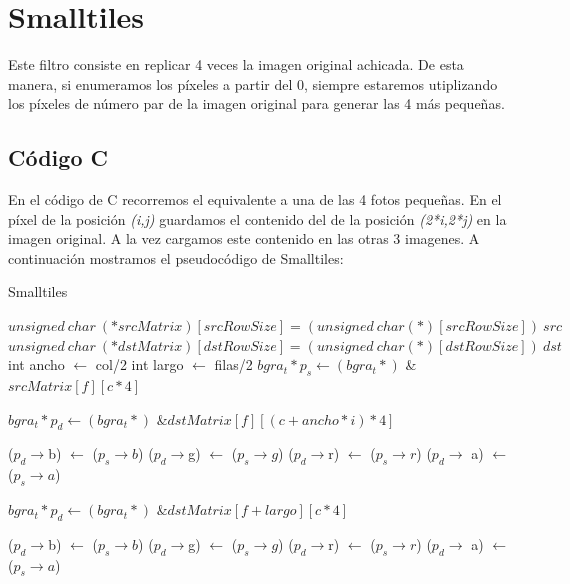 \section{Smalltiles}
Este filtro consiste en replicar 4 veces la imagen original achicada. De esta manera, si enumeramos los píxeles a partir del 0, siempre estaremos utiplizando los píxeles de número par de la imagen original para generar las 4 más pequeñas.
\subsection{Código C}
	En el código de C recorremos el equivalente a una de las 4 fotos pequeñas. En el píxel de la posición \emph{(i,j)} guardamos el contenido del de la posición \emph{(2*i,2*j)} en la imagen original. A la vez cargamos este contenido en las otras 3 imagenes.
	A continuación mostramos el pseudocódigo de Smalltiles:
\begin{algorithm}[h!]
\caption{Smalltiles}
\begin{algorithmic}
	\State $unsigned~ char~ (*srcMatrix)[srcRowSize] = (unsigned~ char (*)[srcRowSize])~ src$
	\State $unsigned~ char~ (*dstMatrix)[dstRowSize] = (unsigned~ char (*)[dstRowSize])~ dst$
	\State int ancho $\gets$ col/2
	\State int largo $\gets$ filas/2
			\State $bgra_t* p_s \gets (bgra_t*)$ \& $srcMatrix[f][c * 4]$
				
				\State $bgra_t *p_d \gets (bgra_t*)$ \&$dstMatrix[f][(c + ancho*i) * 4]$
				
				\State ($p_d \rightarrow$b) $\gets$ ($p_s \rightarrow b$)
				\State ($p_d \rightarrow$g) $\gets$ ($p_s \rightarrow g$)
				\State ($p_d \rightarrow$r) $\gets$ ($p_s \rightarrow r$)
				\State ($p_d \rightarrow$ a) $\gets$ ($p_s \rightarrow a$)
			\EndFor
				
				\State $bgra_t *p_d \gets (bgra_t*)$ \&$dstMatrix[f + largo][c * 4]$
				
				\State ($p_d \rightarrow$b) $\gets$ ($p_s \rightarrow b$)
				\State ($p_d \rightarrow$g) $\gets$ ($p_s \rightarrow g$)
				\State ($p_d \rightarrow$r) $\gets$ ($p_s \rightarrow r$)
				\State ($p_d \rightarrow$ a) $\gets$ ($p_s \rightarrow a$)
			\EndFor
		\EndFor
	\EndFor
\EndFunction

\end{algorithmic} 
\end{algorithm}
	

